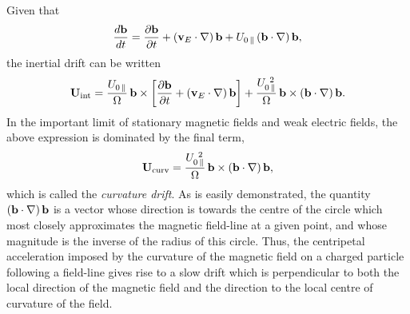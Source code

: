 Given that
\begin{equation}
\frac{d{\bf b}}{dt} = \frac{\partial{\bf b}}{\partial t} + ({\bf v}_E\cdot
\nabla) \,{\bf b} + U_{0\,\parallel} \,({\bf b}\cdot\nabla)\,{\bf b},
\end{equation}
the inertial drift can be written
\begin{equation}
{\bf U}_{\rm int} = \frac{U_{0\,\parallel}}{{\Omega}}\,
{\bf b}\times\left[\frac{\partial{\bf b}}{\partial t} +
({\bf v}_E\cdot\nabla)\,{\bf b}\right] + \frac{U_{0\,\parallel}^{~2}}{{\Omega}}\,
{\bf b}\times ({\bf b}\cdot\nabla)\,{\bf b}.
\end{equation}
In the important limit of stationary magnetic fields and weak electric fields, the 
above expression is dominated by the final term,
\begin{equation}
{\bf U}_{\rm curv} = \frac{U_{0\,\parallel}^{~2}}{{\Omega}}\,
{\bf b}\times ({\bf b}\cdot\nabla)\,{\bf b},
\end{equation}
which is called the {\em curvature drift}. 
As is easily demonstrated, the quantity $({\bf b}\cdot\nabla)\,{\bf b}$
is a vector whose direction is  towards the centre of the circle which
most closely approximates the magnetic field-line at a given point, and whose
magnitude is the inverse of the radius of this circle. Thus, the
centripetal acceleration imposed by the curvature of the magnetic field
on a charged particle following a field-line gives rise to a slow drift which is
perpendicular to both the local direction of the magnetic field and the
 direction to the local centre of curvature of the field. 

